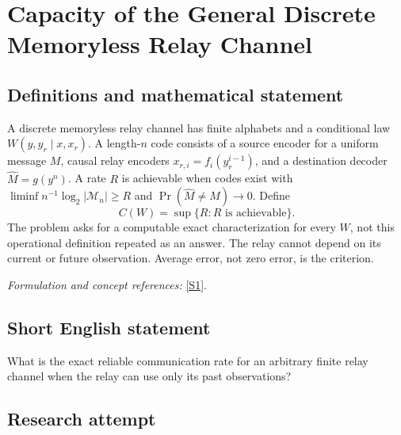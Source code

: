 \documentclass[11pt,a4paper]{article}
\newcommand{\sref}[2]{\hyperlink{source:#1:#2}{[S#2]}}
\newif\ifshowcatalogue
\newcommand{\cataloguescope}[1]{\ifshowcatalogue
 \paragraph{Exact scope in the supplied catalogue.}
 \begin{quote}\small #1\end{quote}\fi}
\numberwithin{equation}{section}
\begin{document}
\setcounter{section}{0}
\clearpage
\section*{\texorpdfstring{Capacity of the General Discrete Memoryless Relay Channel}{Capacity of the General Discrete Memoryless Relay Channel}}\label{statement}
\subsection{Definitions and mathematical statement}
A discrete memoryless relay channel has finite alphabets and a conditional law $W(y,y_r\mid x,x_r)$. A length-$n$ code consists of a source encoder for a uniform message $M$, causal relay encoders $x_{r,i}=f_i(y_r^{i-1})$, and a destination decoder $\widehat M=g(y^n)$. A rate $R$ is achievable when codes exist with $\liminf n^{-1}\log_2|\mathcal M_n|\ge R$ and $\Pr(\widehat M\ne M)\to0$. Define
\[
 C(W)=\sup\{R:R\text{ is achievable}
 \}.
\]
The problem asks for a computable exact characterization for every $W$, not this operational definition repeated as an answer. The relay cannot depend on its current or future observation. Average error, not zero error, is the criterion.
\par\smallskip\textit{Formulation and concept references:} \sref{statement}{1}.
\cataloguescope{Find a computable exact average-error Shannon-capacity characterization for every finite-alphabet discrete memoryless relay channel with law p(y,y\_r|x,x\_r), where the relay input at time i depends only on its observations before time i.}
\subsection{Short English statement}
What is the exact reliable communication rate for an arbitrary finite relay channel when the relay can use only its past observations?
\subsection{Research attempt}
\end{document}
